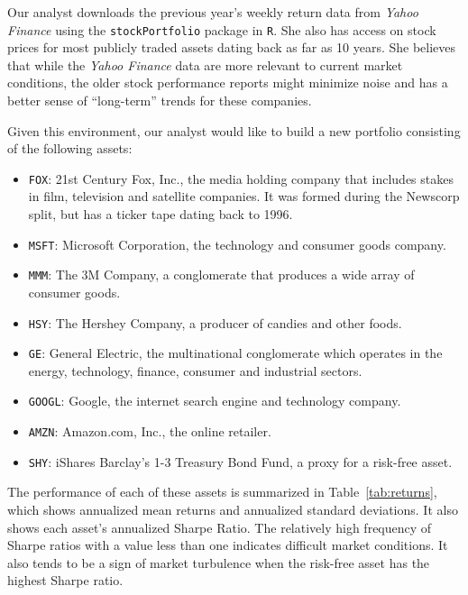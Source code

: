 \documentclass[a4paper]{article}\usepackage[]{graphicx}\usepackage[]{color}
\begin{document}
Our analyst downloads the previous year's weekly return data from \textit{Yahoo Finance} using the \texttt{stockPortfolio} package in \texttt{R}. She also has access on stock prices for most publicly traded assets dating back as far as 10 years. She believes that while the \textit{Yahoo Finance} data are more relevant to current market conditions, the older stock performance reports might minimize noise and has a better sense of ``long-term'' trends for these companies.

Given this environment, our analyst would like to build a new portfolio consisting of the following assets:

\begin{itemize}
    \item \texttt{FOX}: 21st Century Fox, Inc., the media holding company that includes stakes in film, television and satellite companies. It was formed during the Newscorp split, but has a ticker tape dating back to 1996.
    \item \texttt{MSFT}: Microsoft Corporation, the technology and consumer goods company.
    \item \texttt{MMM}: The 3M Company, a conglomerate that produces a wide array of consumer goods.
    \item \texttt{HSY}: The Hershey Company, a producer of candies and other foods.
    \item \texttt{GE}: General Electric, the multinational conglomerate which operates in the energy, technology, finance, consumer and industrial sectors.
    \item \texttt{GOOGL}: Google, the internet search engine and technology company.
    \item \texttt{AMZN}: Amazon.com, Inc., the online retailer.
    \item \texttt{SHY}: iShares Barclay's 1-3 Treasury Bond Fund, a proxy for a risk-free asset.
\end{itemize}

The performance of each of these assets is summarized in Table~\ref{tab:returns}, which shows annualized mean returns and annualized standard deviations. It also shows each asset's annualized Sharpe Ratio. The relatively high frequency of Sharpe ratios with a value less than one indicates difficult market conditions. It also tends to be a sign of market turbulence when the risk-free asset has the highest Sharpe ratio. 
\end{document}

